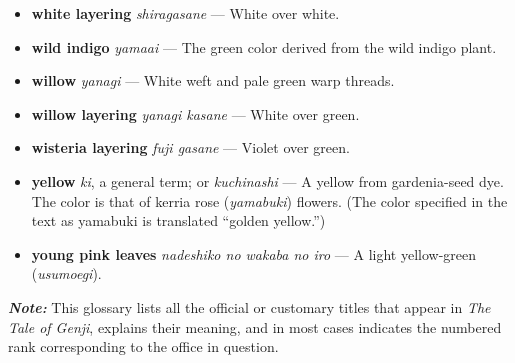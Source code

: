 \documentclass{article}
\begin{document}
\begin{multicols*}{2}
\begin{itemize}[
			label=,
			leftmargin=0em,
			rightmargin=-1.5em,
			itemindent=-2em,
			nosep,
		]
		\item \textbf{white layering} \textit{shiragasane} --- White over white.

		\item \textbf{wild indigo} \textit{yamaai} --- The green color derived from the wild indigo plant.

		\item \textbf{willow} \textit{yanagi} --- White weft and pale green warp threads.

		\item \textbf{willow layering} \textit{yanagi kasane} --- White over green.

		\item \textbf{wisteria layering} \textit{fuji gasane} --- Violet over green.

		\item \textbf{yellow} \textit{ki}, a general term; or \textit{kuchinashi} --- A yellow from gardenia-seed dye. The color is that of kerria rose (\textit{yamabuki}) flowers. (The color specified in the text as yamabuki is translated “golden yellow.”)

		\item \textbf{young pink leaves} \textit{nadeshiko no wakaba no iro} --- A light yellow-green (\textit{usumoegi}).




	\end{itemize}



\end{multicols*}

\clearpage



\noindent \textbf{\textit{Note:}} This glossary lists all the official or customary titles that appear in \textit{The Tale of Genji}, explains their meaning, and in most cases indicates the numbered rank corresponding to the office in question.
\end{document}
